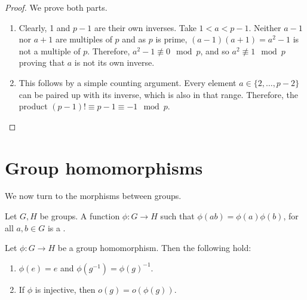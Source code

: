 \begin{proof}
  We prove both parts.
  \begin{enumerate}
  \item
    Clearly, 1 and \(p-1\) are their own inverses.
    Take \(1 < a < p -1\).
    Neither \(a-1\) nor \(a+1\) are multiples of \(p\) and as \(p\) is prime, \((a-1)(a+1) = a^{2} -1\) is not a multiple of \(p\).
    Therefore, \(a^{2}-1 \not\equiv 0 \mod p\), and so \(a^{2} \not\equiv 1 \mod p\) proving that \(a\) is not its own inverse.

  \item
    This follows by a simple counting argument.
    Every element \(a \in \{2, \ldots, p-2\}\) can be paired up with its inverse, which is also in that range.
    Therefore, the product \((p-1)! \equiv p-1 \equiv -1 \mod p\).
  \end{enumerate}
\end{proof}



\section{Group homomorphisms}
\label{sec:group-theory:group-homomorphisms}

We now turn to the morphisms between groups.

\begin{definition}
  \label{def:group-theory:group-homomorphism}
  Let \(G, H\) be groups.
  A function \(\phi : G \to H\) such that \(\phi(ab) = \phi(a) \phi(b)\), for all \(a, b \in G\) is a .
\end{definition}

\begin{lemma}
  Let \(\phi : G \to H\) be a group homomorphism.
  Then the following hold:
  \begin{enumerate}
  \item
    \(\phi(e) = e\) and \(\phi(g^{-1}) = \phi(g) ^{-1}\).
  \item
    If \(\phi\) is injective, then \(o(g) = o\left(\phi(g)\right)\).
  \end{enumerate}
\end{lemma}

